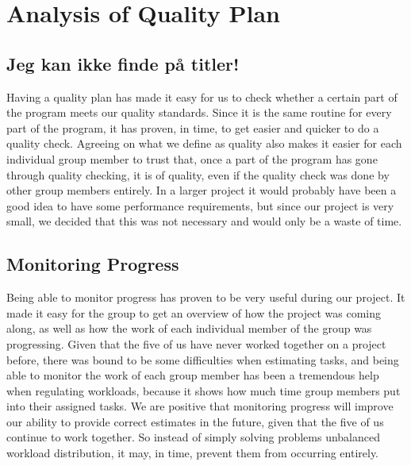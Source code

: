 \section{Analysis of Quality Plan}
\subsection{Jeg kan ikke finde på titler!}
Having a quality plan has made it easy for us to check whether a certain part of the program meets our quality standards. Since it is the same routine for every part of the program, it has proven, in time, to get easier and quicker to do a quality check. Agreeing on what we define as quality also makes it easier for each individual group member to trust that, once a part of the program has gone through quality checking, it is of quality, even if the quality check was done by other group members entirely. In a larger project it would probably have been a good idea to have some performance requirements, but since our project is very small, we decided that this was not necessary and would only be a waste of time.

\subsection{Monitoring Progress}
Being able to monitor progress has proven to be very useful during our project. It made it easy for the group to get an overview of how the project was coming along, as well as how the work of each individual member of the group was progressing. Given that the five of us have never worked together on a project before, there was bound to be some difficulties when estimating tasks, and being able to monitor the work of each group member has been a tremendous help when regulating workloads, because it shows how much time group members put into their assigned tasks.
We are positive that monitoring progress will improve our ability to provide correct estimates in the future, given that the five of us continue to work together. So instead of simply solving problems unbalanced workload distribution, it may, in time, prevent them from occurring entirely.